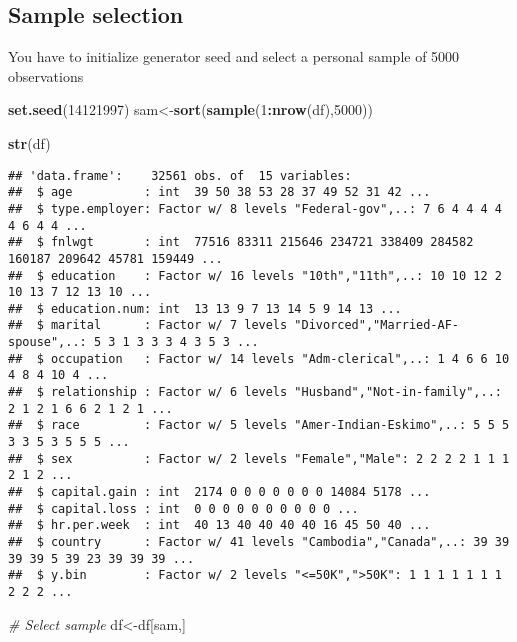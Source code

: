 \documentclass[12pt,]{article}
\newenvironment{Shaded}{\begin{snugshade}}{\end{snugshade}}
\newcommand{\CommentTok}[1]{\textcolor[rgb]{0.56,0.35,0.01}{\textit{#1}}}
\newcommand{\DecValTok}[1]{\textcolor[rgb]{0.00,0.00,0.81}{#1}}
\newcommand{\KeywordTok}[1]{\textcolor[rgb]{0.13,0.29,0.53}{\textbf{#1}}}
\newcommand{\NormalTok}[1]{#1}
\newcommand{\OperatorTok}[1]{\textcolor[rgb]{0.81,0.36,0.00}{\textbf{#1}}}
\begin{document}
\hypertarget{sample-selection}{%
\subsection{Sample selection}\label{sample-selection}}

You have to initialize generator seed and select a personal sample of
5000 observations

\begin{Shaded}
\begin{Highlighting}[]
\KeywordTok{set.seed}\NormalTok{(}\DecValTok{14121997}\NormalTok{)}
\NormalTok{sam<-}\KeywordTok{sort}\NormalTok{(}\KeywordTok{sample}\NormalTok{(}\DecValTok{1}\OperatorTok{:}\KeywordTok{nrow}\NormalTok{(df),}\DecValTok{5000}\NormalTok{))}


\KeywordTok{str}\NormalTok{(df)}
\end{Highlighting}
\end{Shaded}

\begin{verbatim}
## 'data.frame':    32561 obs. of  15 variables:
##  $ age          : int  39 50 38 53 28 37 49 52 31 42 ...
##  $ type.employer: Factor w/ 8 levels "Federal-gov",..: 7 6 4 4 4 4 4 6 4 4 ...
##  $ fnlwgt       : int  77516 83311 215646 234721 338409 284582 160187 209642 45781 159449 ...
##  $ education    : Factor w/ 16 levels "10th","11th",..: 10 10 12 2 10 13 7 12 13 10 ...
##  $ education.num: int  13 13 9 7 13 14 5 9 14 13 ...
##  $ marital      : Factor w/ 7 levels "Divorced","Married-AF-spouse",..: 5 3 1 3 3 3 4 3 5 3 ...
##  $ occupation   : Factor w/ 14 levels "Adm-clerical",..: 1 4 6 6 10 4 8 4 10 4 ...
##  $ relationship : Factor w/ 6 levels "Husband","Not-in-family",..: 2 1 2 1 6 6 2 1 2 1 ...
##  $ race         : Factor w/ 5 levels "Amer-Indian-Eskimo",..: 5 5 5 3 3 5 3 5 5 5 ...
##  $ sex          : Factor w/ 2 levels "Female","Male": 2 2 2 2 1 1 1 2 1 2 ...
##  $ capital.gain : int  2174 0 0 0 0 0 0 0 14084 5178 ...
##  $ capital.loss : int  0 0 0 0 0 0 0 0 0 0 ...
##  $ hr.per.week  : int  40 13 40 40 40 40 16 45 50 40 ...
##  $ country      : Factor w/ 41 levels "Cambodia","Canada",..: 39 39 39 39 5 39 23 39 39 39 ...
##  $ y.bin        : Factor w/ 2 levels "<=50K",">50K": 1 1 1 1 1 1 1 2 2 2 ...
\end{verbatim}

\begin{Shaded}
\begin{Highlighting}[]
\CommentTok{# Select sample}
\NormalTok{df<-df[sam,]}
\end{Highlighting}
\end{Shaded}
\end{document}
